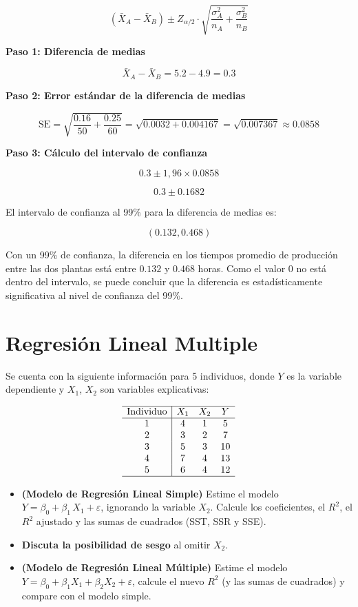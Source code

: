 \documentclass[10pt,a4paper]{article}
\begin{document}
 \[
 (\bar{X}_A - \bar{X}_B) \pm Z_{\alpha/2} \cdot \sqrt{\frac{\sigma_A^2}{n_A} + \frac{\sigma_B^2}{n_B}}
\]

{\bf Paso 1: Diferencia de medias}

 \[
 \bar{X}_A - \bar{X}_B = 5.2 - 4.9 = 0.3
 \]

{\bf Paso 2: Error estándar de la diferencia de medias}

 \[
 \text{SE} = \sqrt{\frac{0.16}{50} + \frac{0.25}{60}} = \sqrt{0.0032 + 0.004167} = \sqrt{0.007367} \approx 0.0858
 \]

{\bf Paso 3: Cálculo del intervalo de confianza}

\[
 0.3 \pm 1,96 \times 0.0858
 \]

 \[
 0.3 \pm 0.1682
 \]


 El intervalo de confianza al 99\% para la diferencia de medias es:

\[
(0.132, 0.468)
\]


Con un 99\% de confianza, la diferencia en los tiempos promedio de producción entre las dos plantas está entre \(0.132\) y \(0.468\) horas. Como el valor 0 no está dentro del intervalo, se puede concluir que la diferencia es estadísticamente significativa al nivel de confianza del 99\%.




\section{Regresión Lineal Multiple}

Se cuenta con la siguiente información para 5 individuos, donde $Y$ es la variable dependiente y $X_1$, $X_2$ son variables explicativas:

\[
\begin{array}{c|ccc}
\hline
\text{Individuo} & X_1 & X_2 & Y \\
\hline
1 & 4 & 1 & 5 \\
2 & 3 & 2 & 7 \\
3 & 5 & 3 & 10 \\
4 & 7 & 4 & 13 \\
5 & 6 & 4 & 12 \\
\hline
\end{array}
\]

\begin{itemize}
  \item \textbf{(Modelo de Regresión Lineal Simple)} Estime el modelo $Y = \beta_0 + \beta_1\,X_1 + \varepsilon$, ignorando la variable $X_2$. Calcule los coeficientes, el $R^2$, el $R^2$ ajustado y las sumas de cuadrados (SST, SSR y SSE).
  \item \textbf{Discuta la posibilidad de sesgo} al omitir $X_2$.
  \item \textbf{(Modelo de Regresión Lineal Múltiple)} Estime el modelo $Y = \beta_0 + \beta_1 X_1 + \beta_2 X_2 + \varepsilon$, calcule el nuevo $R^2$ (y las sumas de cuadrados) y compare con el modelo simple.
\end{itemize}
\end{document}
